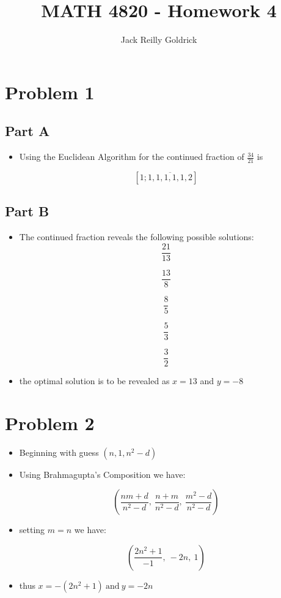\documentclass[]{report}
\title{MATH 4820 - Homework 4}
\author{Jack Reilly Goldrick}
\begin{document}
	\maketitle

\section{Problem 1}

\subsection{Part A}

\begin{itemize}
	\item Using the Euclidean Algorithm for the continued fraction of $\frac{34}{21}$ is
	

	
	$$ [1; \overline{1, 1, 1, 1, 1, 2}]  $$
	


\end{itemize}



\subsection{Part B}


\begin{itemize}
	\item The continued fraction reveals the following possible solutions:
			$$ \frac{21}{13}$$
			
			$$ \frac{13}{8} $$
			
			$$ \frac{8}{5}$$
			
			$$\frac{5}{3}$$
			
			$$\frac{3}{2}$$
			
			
			\item the optimal solution is to be revealed as $x = 13$ and $y = -8$  
			
\end{itemize}


\section{Problem 2}

\begin{itemize}
	\item Beginning with guess $(n, 1,  n^2 - d)$
	
	\item Using Brahmagupta's Composition we have:
	
	$$ (\frac{n m + d }{n^2 - d}, \ \frac{n + m }{n^2 - d}, \  \frac{m^2 - d}{n^2 - d}) $$
	
	
	\item setting $ m = n$ we have:
	
	$$ (\frac{2 n^2 + 1 }{- 1}, \ -2n, \  1) $$
	
	\item thus $x = - (2 n^2 + 1 ) \ \text{and} \ y = -2n$
	
	
\end{itemize} 
\end{document}
